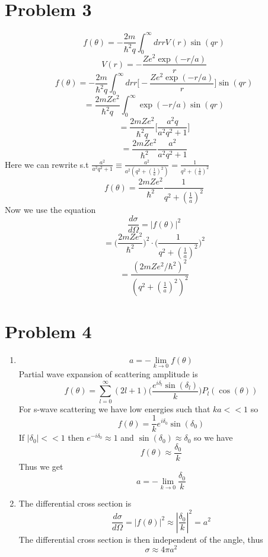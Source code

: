 \documentclass[12pt]{article}
\begin{document}
\section*{Problem 3}
$$ f(\theta) = - \frac{2m}{\hbar^2 q} \int_0^{\infty} dr r V(r) \sin(qr) $$
$$ V(r) = - \frac{Ze^2 \exp(-r/a)}{r} $$
$$ f(\theta) = - \frac{2m}{\hbar^2 q} \int_0^{\infty} dr r \Big[ - \frac{Ze^2 \exp(-r/a) }{r} \Big] \sin(qr) $$
$$ = \frac{2mZe^2}{\hbar^2 q} \int_0^{\infty} \exp(-r/a) \sin(qr) $$
$$ = \frac{2mZe^2}{\hbar^2 q} \Big[\frac{a^2 q}{a^2 q^2 +1} \Big] $$
$$ = \frac{2mZe^2}{\hbar^2} \frac{a^2}{a^2 q^2 +1 } $$
Here we can rewrite s.t $\frac{a^2}{a^2 q^2 +1 } \equiv \frac{a^2}{a^2 (q^2 + (\frac{1}{a} )^2)} = \frac{1}{q^2 + (\frac{1}{a} )^2} $
$$ f(\theta) = \frac{2mZe^2}{\hbar^2} \frac{1}{q^2 + (\frac{1}{a} )^2 } $$
Now we use the equation 
$$ \frac{d \sigma}{d \Omega} = | f (\theta) |^2 $$
$$ = \Big( \frac{2mZe^2}{\hbar^2} \Big)^2 \cdot \Big( \frac{1}{q^2 + (\frac{1}{a} )^2}\Big)^2 $$
$$ = \frac{(2mZe^2/ \hbar^2)^2}{(q^2 + (\frac{1}{a} )^2)^2} $$

\section*{Problem 4}
\begin{enumerate}
    \item $$ a = - \lim_{k \to 0} f(\theta) $$
    Partial wave expansion of scattering amplitude is 
    $$ f (\theta) = \sum_{l=0}^{\infty} (2l +1) \Big( \frac{e^{i \delta_l} \sin (\delta_l) }{k}\Big) P_l (\cos (\theta)) $$
    For s-wave scattering we have low energies such that $ka << 1$ so 
    $$ f(\theta) = \frac{1}{k} e^{i \delta_0} \sin(\delta_0) $$
    If $|\delta_0| < < 1$ then $e^{-i \delta_0} \approx 1$ and $\sin (\delta_0 ) \approx \delta_0 $ so we have 
    $$ f(\theta ) \approx \frac{\delta_0}{k} $$
    Thus we get 
    $$ a = - \lim_{k \to 0} \frac{\delta_0}{k} $$

    \item The differential cross section is 
    $$ \frac{d \sigma}{d \Omega} = | f(\theta)|^2 \approx | \frac{\delta_0}{k}|^2 = a^2 $$
    The differential cross section is then independent of the angle, thus 
    $$ \sigma \approx 4 \pi a^2 $$

\end{enumerate}
\end{document}

